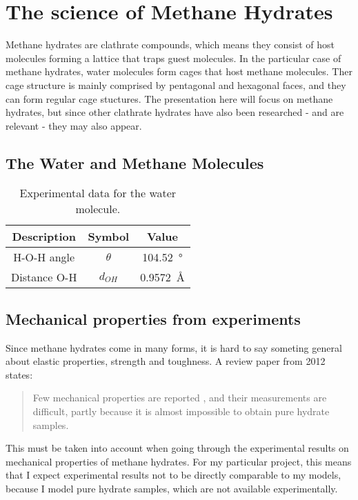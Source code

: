 \chapter{The science of Methane Hydrates}
Methane hydrates are clathrate compounds, which means they consist of host molecules forming a lattice that traps guest molecules. In the particular case of methane hydrates, water molecules form cages that host methane molecules. Ther cage structure is mainly comprised by pentagonal and hexagonal faces, and they can form regular cage stuctures. The presentation here will focus on methane hydrates, but since other clathrate hydrates have also been researched - and are relevant - they may also appear.



\section{The Water and Methane Molecules}
\begin{table}[h!tb]
\caption{Experimental data for the water molecule.}
\label{tb:intro:h2odata}
\begin{center}
\begin{tabular}{c|c|c}
Description & Symbol & Value \\
\hline
H-O-H angle & $\theta$ & \SI{104.52}{\degree} \\
Distance O-H & $d_{OH}$ & \SI{0.9572}{\angstrom} \\
\end{tabular}
\end{center}
\end{table}


\section{Mechanical properties from experiments}
Since methane hydrates come in many forms, it is hard to say someting general about elastic properties, strength and toughness. A review paper from 2012 \cite{Ning2012} states:
\begin{quotation}
Few mechanical properties are reported , and their measurements are difficult, partly because it is almost impossible to obtain pure hydrate samples.
\end{quotation}

This must be taken into account when going through the experimental results on mechanical properties of methane hydrates. For my particular project, this means that I expect experimental results not to be directly comparable to my models, because I model pure hydrate samples, which are not available experimentally. 

